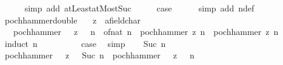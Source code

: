 \begin{isabellebody}
\ \ \ \ \isamarkupfalse%
\ {\isacharparenleft}{\kern0pt}simp\ add{\isacharcolon}{\kern0pt}\ atLeast{}{\isacharunderscore}{\kern0pt}atMost{\isacharunderscore}{\kern0pt}Suc{\isacharparenright}{\kern0pt}\isanewline
\ \ \isamarkupfalse%
\ \isamarkupfalse%
\ {\isacharquery}{\kern0pt}case\isanewline
\ \ \ \ \isamarkupfalse%
\ {\isacharparenleft}{\kern0pt}simp\ add{\isacharcolon}{\kern0pt}\ n{\isacharprime}{\kern0pt}{\isacharunderscore}{\kern0pt}def{\isacharparenright}{\kern0pt}\isanewline
{}\isamarkupfalse%
%
\endisatagproof
{\isafoldproof}%
%
\isadelimproof
\isanewline
%
\endisadelimproof
\isanewline
{}\isamarkupfalse%
\ pochhammer{\isacharunderscore}{\kern0pt}double{\isacharcolon}{\kern0pt}\isanewline
\ \ \ z\ {\isacharcolon}{\kern0pt}{\isacharcolon}{\kern0pt}\ {\isachardoublequoteopen}{\isacharprime}{\kern0pt}a{\isacharcolon}{\kern0pt}{\isacharcolon}{\kern0pt}field{\isacharunderscore}{\kern0pt}char{\isacharunderscore}{\kern0pt}{}{\isachardoublequoteclose}\isanewline
\ \ \ {\isachardoublequoteopen}pochhammer\ {\isacharparenleft}{\kern0pt}{}\ {\isacharasterisk}{\kern0pt}\ z{\isacharparenright}{\kern0pt}\ {\isacharparenleft}{\kern0pt}{}\ {\isacharasterisk}{\kern0pt}\ n{\isacharparenright}{\kern0pt}\ {\isacharequal}{\kern0pt}\ of{\isacharunderscore}{\kern0pt}nat\ {\isacharparenleft}{\kern0pt}{}{\isacharcircum}{\kern0pt}{\isacharparenleft}{\kern0pt}{}{\isacharasterisk}{\kern0pt}n{\isacharparenright}{\kern0pt}{\isacharparenright}{\kern0pt}\ {\isacharasterisk}{\kern0pt}\ pochhammer\ z\ n\ {\isacharasterisk}{\kern0pt}\ pochhammer\ {\isacharparenleft}{\kern0pt}z{\isacharplus}{\kern0pt}{}{\isacharslash}{\kern0pt}{}{\isacharparenright}{\kern0pt}\ n{\isachardoublequoteclose}\isanewline
%
\isadelimproof
%
\endisadelimproof
%
\isatagproof
{}\isamarkupfalse%
\ {\isacharparenleft}{\kern0pt}induct\ n{\isacharparenright}{\kern0pt}\isanewline
\ \ \isamarkupfalse%
\ {}\isanewline
\ \ \isamarkupfalse%
\ \isamarkupfalse%
\ {\isacharquery}{\kern0pt}case\ \isamarkupfalse%
\ simp\isanewline
{}\isamarkupfalse%
\isanewline
\ \ \isamarkupfalse%
\ {\isacharparenleft}{\kern0pt}Suc\ n{\isacharparenright}{\kern0pt}\isanewline
\ \ \isamarkupfalse%
\ {\isachardoublequoteopen}pochhammer\ {\isacharparenleft}{\kern0pt}{}\ {\isacharasterisk}{\kern0pt}\ z{\isacharparenright}{\kern0pt}\ {\isacharparenleft}{\kern0pt}{}\ {\isacharasterisk}{\kern0pt}\ {\isacharparenleft}{\kern0pt}Suc\ n{\isacharparenright}{\kern0pt}{\isacharparenright}{\kern0pt}\ {\isacharequal}{\kern0pt}\ pochhammer\ {\isacharparenleft}{\kern0pt}{}\ {\isacharasterisk}{\kern0pt}\ z{\isacharparenright}{\kern0pt}\ {\isacharparenleft}{\kern0pt}{}\ {\isacharasterisk}{\kern0pt}\ n{\isacharparenright}{\kern0pt}\ {\isacharasterisk}{\kern0pt}\isanewline

\end{isabellebody}
